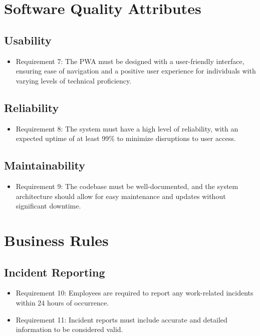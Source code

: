 \documentclass{scrreprt}
\begin{document}
\section{Software Quality Attributes}

\subsection{Usability}

\begin{itemize}
    \item Requirement 7: The PWA must be designed with a user-friendly interface, ensuring ease of navigation and a positive user experience for individuals with varying levels of technical proficiency.
\end{itemize}

\subsection{Reliability}

\begin{itemize}
    \item Requirement 8: The system must have a high level of reliability, with an expected uptime of at least 99\% to minimize disruptions to user access.
\end{itemize}

\subsection{Maintainability}

\begin{itemize}
    \item Requirement 9: The codebase must be well-documented, and the system architecture should allow for easy maintenance and updates without significant downtime.
\end{itemize}

\section{Business Rules}

\subsection{Incident Reporting}

\begin{itemize}
    \item Requirement 10: Employees are required to report any work-related incidents within 24 hours of occurrence.
    \item Requirement 11: Incident reports must include accurate and detailed information to be considered valid.
\end{itemize}
\end{document}
